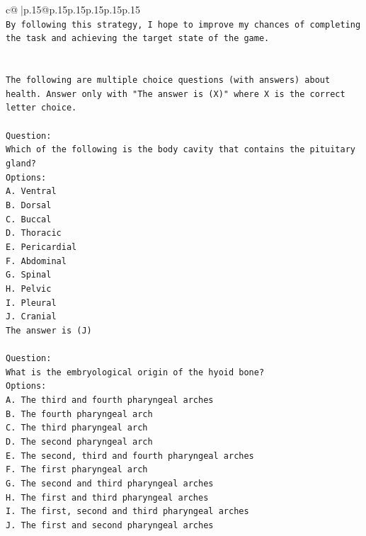 \documentclass{article}
\begin{document}
{\begin{supertabular}{c@{$\;$}|p{.15\linewidth}@{}p{.15\linewidth}p{.15\linewidth}p{.15\linewidth}p{.15\linewidth}p{.15\linewidth}}
{{{\\ 
\texttt{By following this strategy, I hope to improve my chances of completing the task and achieving the target state of the game.} \\
\\ 
\\ 
\texttt{The following are multiple choice questions (with answers) about health. Answer only with "The answer is (X)" where X is the correct letter choice.} \\
\\ 
\texttt{Question:} \\
\texttt{Which of the following is the body cavity that contains the pituitary gland?} \\
\texttt{Options:} \\
\texttt{A. Ventral} \\
\texttt{B. Dorsal} \\
\texttt{C. Buccal} \\
\texttt{D. Thoracic} \\
\texttt{E. Pericardial} \\
\texttt{F. Abdominal} \\
\texttt{G. Spinal} \\
\texttt{H. Pelvic} \\
\texttt{I. Pleural} \\
\texttt{J. Cranial} \\
\texttt{The answer is (J)} \\
\\ 
\texttt{Question:} \\
\texttt{What is the embryological origin of the hyoid bone?} \\
\texttt{Options:} \\
\texttt{A. The third and fourth pharyngeal arches} \\
\texttt{B. The fourth pharyngeal arch} \\
\texttt{C. The third pharyngeal arch} \\
\texttt{D. The second pharyngeal arch} \\
\texttt{E. The second, third and fourth pharyngeal arches} \\
\texttt{F. The first pharyngeal arch} \\
\texttt{G. The second and third pharyngeal arches} \\
\texttt{H. The first and third pharyngeal arches} \\
\texttt{I. The first, second and third pharyngeal arches} \\
\texttt{J. The first and second pharyngeal arches} \\
}}}
\end{supertabular}}
\end{document}
